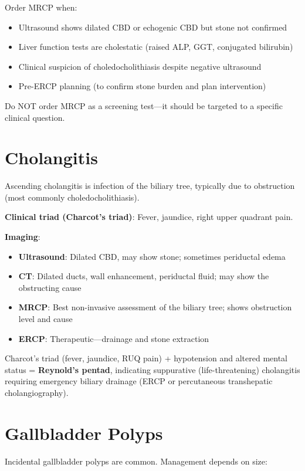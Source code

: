 \begin{pearlbox}
Order MRCP when:
\begin{itemize}
  \item Ultrasound shows dilated CBD or echogenic CBD but stone not confirmed
  \item Liver function tests are cholestatic (raised ALP, GGT, conjugated bilirubin)
  \item Clinical suspicion of choledocholithiasis despite negative ultrasound
  \item Pre-ERCP planning (to confirm stone burden and plan intervention)
\end{itemize}
Do NOT order MRCP as a screening test---it should be targeted to a specific clinical question.
\end{pearlbox}


\section{Cholangitis}
Ascending cholangitis is infection of the biliary tree, typically due to obstruction (most commonly choledocholithiasis).

\textbf{Clinical triad (Charcot's triad)}: Fever, jaundice, right upper quadrant pain.

\textbf{Imaging}:
\begin{itemize}
  \item \textbf{Ultrasound}: Dilated CBD, may show stone; sometimes periductal edema
  \item \textbf{CT}: Dilated ducts, wall enhancement, periductal fluid; may show the obstructing cause
  \item \textbf{MRCP}: Best non-invasive assessment of the biliary tree; shows obstruction level and cause
  \item \textbf{ERCP}: Therapeutic---drainage and stone extraction
\end{itemize}

\begin{pearlbox}
Charcot's triad (fever, jaundice, RUQ pain) + hypotension and altered mental status = \textbf{Reynold's pentad}, indicating suppurative (life-threatening) cholangitis requiring emergency biliary drainage (ERCP or percutaneous transhepatic cholangiography).
\end{pearlbox}


\section{Gallbladder Polyps}
Incidental gallbladder polyps are common. Management depends on size:

